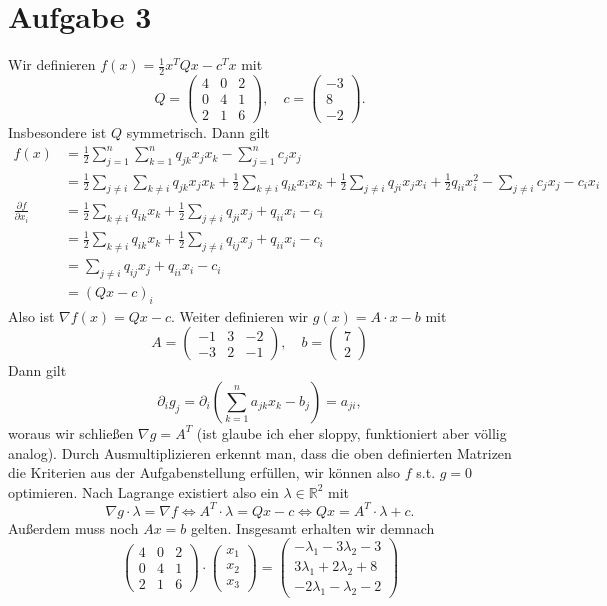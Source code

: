 \documentclass{article}
\theoremstyle{definition}
\newcommand{\R}{\mathbb{R}}
\newcommand{\pdv}[2]{\frac{\partial #1}{\partial #2}}
\begin{document}
\section*{Aufgabe 3}
Wir definieren $f(x) = \frac{1}{2}x^TQx - c^Tx$ mit \[Q = \begin{pmatrix}
	4 & 0 & 2\\0 & 4 & 1\\2 & 1&6
\end{pmatrix},\quad c = \begin{pmatrix}
	-3\\8\\-2
\end{pmatrix}.\] Insbesondere ist $Q$ symmetrisch. Dann gilt
\begin{align*}
	f(x) &= \frac{1}{2}\sum_{j = 1}^{n}\sum_{k = 1}^{n}q_{jk}x_jx_k - \sum_{j = 1}^{n}c_jx_j\\
	&= \frac{1}{2}\sum_{j \neq i}\sum_{k \neq i}q_{jk}x_jx_k + \frac{1}{2}\sum_{k \neq i} q_{ik}x_ix_k + \frac{1}{2}\sum_{j \neq i}q_{ji}x_jx_i + \frac{1}{2}q_{ii}x_i^2 - \sum_{j\neq i}c_jx_j - c_ix_i\\
	\pdv{f}{x_i} &= \frac{1}{2} \sum_{k \neq i}q_{ik}x_k + \frac{1}{2} \sum_{j \neq i}q_{ji}x_j + q_{ii}x_i - c_i\\
	&= \frac{1}{2} \sum_{k \neq i}q_{ik}x_k + \frac{1}{2} \sum_{j \neq i}q_{ij}x_j + q_{ii}x_i - c_i\\
	&= \sum_{j \neq i}q_{ij}x_j + q_{ii}x_i - c_i\\
	&= (Qx - c)_i
\end{align*}
Also ist $\nabla f(x) = Qx-c$.
Weiter definieren wir $g(x) = A\cdot x - b$ mit \[A = \begin{pmatrix}
	-1 & 3 & -2\\-3&2&-1
\end{pmatrix},\quad b = \begin{pmatrix}
	7 \\ 2
\end{pmatrix}\]
Dann gilt \[\partial_i g_j = \partial_i\left(\sum_{k = 1}^na_{jk}x_k - b_j\right) = a_{ji},\] woraus wir schließen $\nabla g = A^T$ (ist glaube ich eher sloppy, funktioniert aber völlig analog).
Durch Ausmultiplizieren erkennt man, dass die oben definierten Matrizen die Kriterien aus der Aufgabenstellung erfüllen, wir können also $f$ s.t. $g = 0$ optimieren.
Nach Lagrange existiert also ein $\lambda \in \R^2$ mit \[\nabla g\cdot \lambda = \nabla f \Leftrightarrow A^T\cdot \lambda = Qx - c \Leftrightarrow Qx= A^T\cdot \lambda + c.\]
Außerdem muss noch $Ax = b$ gelten. Insgesamt erhalten wir demnach \[
	\begin{pmatrix}
		4 & 0 & 2\\0 & 4 & 1\\2 & 1&6
	\end{pmatrix} \cdot \begin{pmatrix}
		x_1\\x_2\\x_3
	\end{pmatrix}=\begin{pmatrix}
		-\lambda_1  -3\lambda_2 - 3\\
		3\lambda_1 + 2\lambda_2 + 8\\
		-2\lambda_1  -\lambda_2 -2
	\end{pmatrix}
\]
\end{document}
